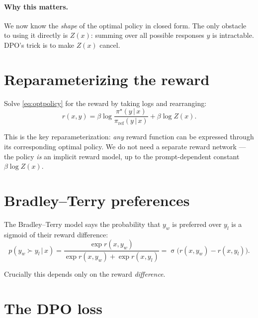 \documentclass[11pt]{article}
\newcommand{\given}{\,\vert\,}
\newcommand{\piref}{\pi_{\mathrm{ref}}}  %
\newcommand{\polstar}{\pi^{\star}}       %
\newcommand{\yw}{y_w}                     %
\newcommand{\yl}{y_l}                     %
\DeclareMathOperator{\sigmoid}{\sigma}
\begin{document}
\paragraph{Why this matters.} We now know the \emph{shape} of the optimal policy
in closed form. The only obstacle to using it directly is $Z(x)$: summing over
all possible responses $y$ is intractable. DPO's trick is to make $Z(x)$ cancel.

\section{Reparameterizing the reward}

Solve \eqref{eq:optpolicy} for the reward by taking logs and rearranging:
\begin{equation}
  r(x, y)
  = \beta \log \frac{\polstar(y \given x)}{\piref(y \given x)}
  + \beta \log Z(x).
  \label{eq:reward-reparam}
\end{equation}

This is the key reparameterization: \emph{any} reward function can be expressed
through its corresponding optimal policy. We do not need a separate reward
network --- the policy \emph{is} an implicit reward model, up to the
prompt-dependent constant $\beta \log Z(x)$.

\section{Bradley--Terry preferences}

The Bradley--Terry model says the probability that $\yw$ is preferred over $\yl$
is a sigmoid of their reward difference:
\begin{equation}
  p(\yw \succ \yl \given x)
  = \frac{\exp r(x, \yw)}{\exp r(x, \yw) + \exp r(x, \yl)}
  = \sigmoid\!\big( r(x, \yw) - r(x, \yl) \big).
  \label{eq:bt}
\end{equation}

Crucially this depends only on the reward \emph{difference}.

\section{The DPO loss}
\end{document}

